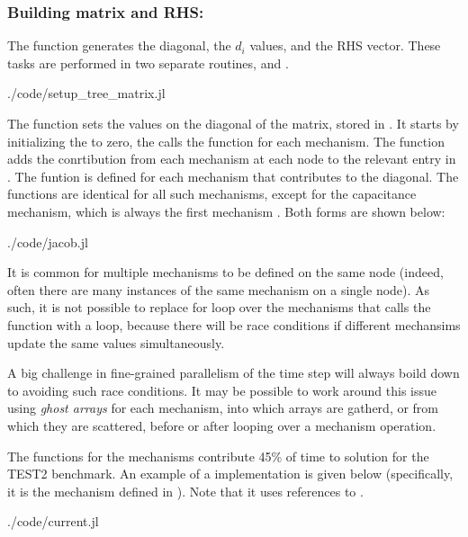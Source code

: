 \subsubsection{Building matrix and RHS: }
\label{sec:matrix_rhs}
The function  generates the diagonal, the $d_i$ values, and the RHS vector. These tasks are performed in two separate routines,  and .
\begin{shaded}
 {./code/setup_tree_matrix.jl}
\end{shaded}

The  function sets the values on the diagonal of the matrix, stored in . It starts by initializing the  to zero, the calls the  function for each mechanism. The  function adds the conrtibution from each mechanism at each node to the relevant entry in .
The  funtion is defined for each mechanism that contributes to the diagonal.
The  functions are identical for all such mechanisms, except for the capacitance mechanism, which is always the first mechanism .
Both forms are shown below:

\begin{shaded}
 {./code/jacob.jl}
\end{shaded}

It is common for multiple mechanisms to be defined on the same node (indeed, often there are many instances of the same mechanism on a single node). As such, it is not possible to replace for loop over the mechanisms that calls the  function with a  loop, because there will be race conditions if different mechansims update the same  values simultaneously.

\begin{note}
A big challenge in fine-grained parallelism of the time step will always boild down to avoiding such race conditions. It may be possible to work around this issue using \emph{ghost arrays} for each mechanism, into which  arrays are gatherd, or from which they are scattered, before or after looping over a mechanism operation.
\end{note}

The  functions for the mechanisms contribute 45\% of time to solution for the TEST2 benchmark. An  example of a  implementation is given below (specifically, it is the mechanism defined in ). Note that it uses references to .
\begin{shaded}
 {./code/current.jl}
\end{shaded}

